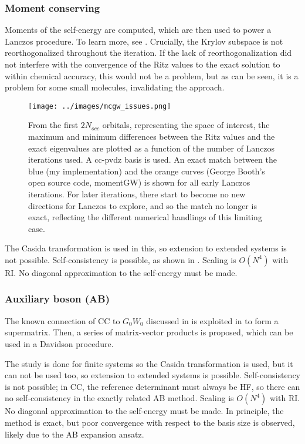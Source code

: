 \subsubsection{Moment conserving} Moments of the self-energy are computed, which are then used to power a Lanczos procedure. To learn more, see \cite{scott2023moment}. Crucially, the Krylov subspace is not reorthogonalized throughout the iteration. If the lack of reorthogonalization did not interfere with the convergence of the Ritz values to the exact solution to within chemical accuracy, this would not be a problem, but as can be seen, it is a problem for some small molecules, invalidating the approach. 
\begin{figure}
    \centering
    \texttt{[image: ../images/mcgw\_issues.png]}
    \caption{From the first $2N_{occ}$ orbitals, representing the space of interest, the maximum and minimum differences between the Ritz values and the exact eigenvalues are plotted as a function of the number of Lanczos iterations used. A cc-pvdz basis is used. An exact match between the blue (my implementation) and the orange curves (George Booth's open source code, momentGW) is shown for all early Lanczos iterations. For later iterations, there start to become no new directions for Lanczos to explore, and so the match no longer is exact, reflecting the different numerical handlings of this limiting case.}
\end{figure}
\begin{tcolorbox}
The Casida transformation is used in this, so extension to extended systems is not possible. Self-consistency is possible, as shown in \cite{backhouse2025self}. Scaling is $O(N^4)$ with RI. No diagonal approximation to the self-energy must be made.
\end{tcolorbox}
\subsubsection{Auxiliary boson (AB)}
The known connection of CC to $G_0W_0$ discussed in \cite{tolle2023exact} is exploited in \cite{tolle2024ab} to form a supermatrix. Then, a series of matrix-vector products is proposed, which can be used in a Davidson procedure.
\begin{tcolorbox}
The study is done for finite systems so the Casida transformation is used, but it can not be used too, so extension to extended systems is possible. Self-consistency is not possible; in CC, the reference determinant must always be HF, so there can no self-consistency in the exactly related AB method. Scaling is $O(N^4)$ with RI. No diagonal approximation to the self-energy must be made. In principle, the method is exact, but poor convergence with respect to the basis size is observed, likely due to the AB expansion ansatz.
\end{tcolorbox}
